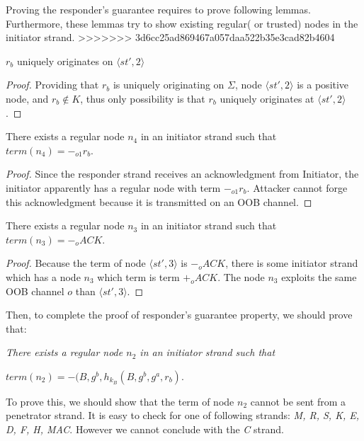 \begin{itemize}
Proving the responder's guarantee requires to prove following lemmas. Furthermore, these lemmas try to show existing regular( or trusted) nodes in the initiator strand.  
>>>>>>> 3d6cc25ad869467a057daa522b35e3cad82b4604

\begin{Lemma}
$r_b$ uniquely originates on $\langle st',2 \rangle$ 
\end{Lemma}
\begin{proof}
Providing that $r_b$ is uniquely originating on $\Sigma$, node $\langle st',2 \rangle $ is a positive node, and $r_b \not\in K$, thus only possibility is that $r_b$ uniquely originates at $\langle st',2 \rangle$ .
\end{proof}

\begin{Lemma}
There exists a regular node $n_4$ in an initiator strand such that $term(n_4) = -_{o1} r_b$.
\end{Lemma}
\begin{proof}
Since the responder strand receives an acknowledgment from Initiator, the initiator apparently has a regular node with term $-_{o1} r_b$. Attacker cannot forge this acknowledgment because it is transmitted on an OOB channel. 
\end{proof}

\begin{Lemma}
There exists a regular node $n_3$ in an initiator strand such that $term(n_3) = -_o ACK$.
\end{Lemma}
\begin{proof}
Because the term of node $\langle st',3 \rangle$ is $-_o ACK$, there is some initiator strand which has a node $n_3$ which term is term $+_o ACK$. The node $n_3$ exploits the same OOB channel $o$ than $\langle st',3 \rangle$.
\end{proof}

Then, to complete the proof of responder's guarantee property, we should prove that:
 
\textit{There exists a regular node $n_2$ in an initiator strand such that} \begin{center}$term(n_2) = -(B, g^b, h_{k_B}(B,g^b,g^a,r_b)$.\end{center}

To prove this, we should show that the term of node $n_2$ cannot be sent from a penetrator strand. It is easy to check for one of following strands: \textit{M, R, S, K, E, D, F, H, MAC}. However we cannot conclude with the \textit{C} strand.


\end{itemize}
